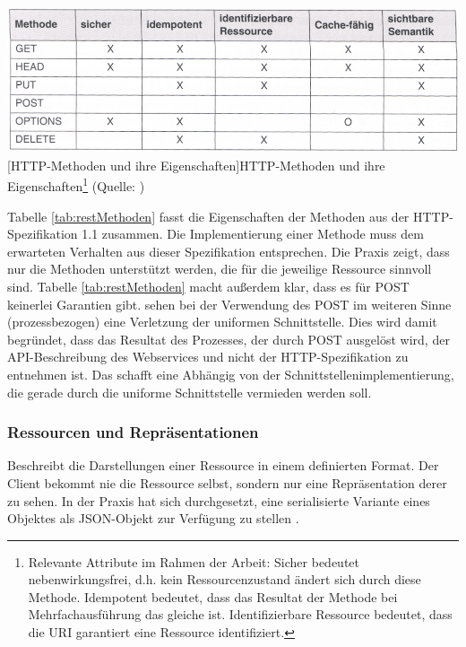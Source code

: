 \documentclass[11pt, a4paper, titlepage, listof=totoc, bibliography=totoc, index=totoc, twoside, openright, headings=normal]{scrreprt}
\begin{document}
\vspace{1em}
\begin{minipage}{\linewidth}
	\centering
	\includegraphics[width=0.7\linewidth]{Abbildungen/restMethoden.png}
	[HTTP-Methoden und ihre Eigenschaften]{HTTP-Methoden und ihre Eigenschaften\footnote{Relevante Attribute im Rahmen der Arbeit: \glqq Sicher\grqq{} bedeutet nebenwirkungsfrei, d.h. kein Ressourcenzustand ändert sich durch diese Methode. \glqq Idempotent\grqq{} bedeutet, dass das Resultat der Methode bei Mehrfachausführung das gleiche ist. \glqq Identifizierbare Ressource\grqq{} bedeutet, dass die URI garantiert eine Ressource identifiziert.}
	(Quelle: \citet{tilkov11})}
	\label{tab:restMethoden}
\end{minipage}
\vspace{1em}

Tabelle \ref{tab:restMethoden} fasst die Eigenschaften der Methoden aus der HTTP-Spezifikation 1.1 zusammen. Die Implementierung einer Methode muss dem erwarteten Verhalten aus dieser Spezifikation entsprechen. Die Praxis zeigt, dass nur die Methoden unterstützt werden, die für die jeweilige Ressource sinnvoll sind. Tabelle \ref{tab:restMethoden} macht außerdem klar, dass es für POST keinerlei Garantien gibt. \citet{richardson07} sehen bei der Verwendung des POST im weiteren Sinne (prozessbezogen) eine Verletzung der uniformen Schnittstelle. Dies wird damit begründet, dass das Resultat des Prozesses, der durch POST ausgelöst wird, der API-Beschreibung des Webservices und nicht der HTTP-Spezifikation zu entnehmen ist. Das schafft eine Abhängig von der Schnittstellenimplementierung, die gerade durch die uniforme Schnittstelle vermieden werden soll.

\subsubsection*{Ressourcen und Repräsentationen}
Beschreibt die Darstellungen einer Ressource in einem definierten Format. Der Client bekommt nie die Ressource selbst, sondern nur eine Repräsentation derer zu sehen. In der Praxis hat sich durchgesetzt, eine serialisierte Variante eines Objektes als JSON-Objekt zur Verfügung zu stellen \citep{tilkov11}.
\end{document}
